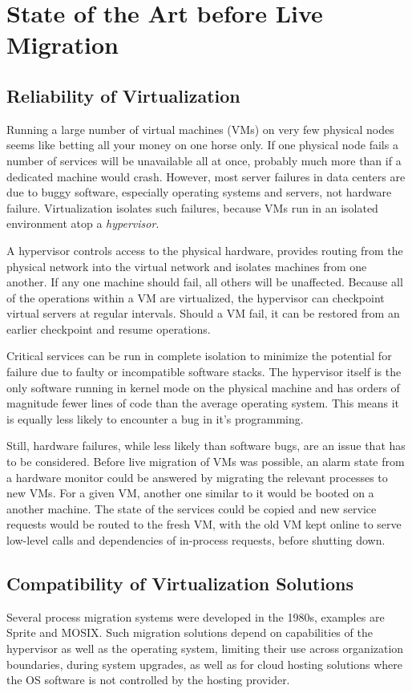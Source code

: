 \documentclass{scrartcl}
\begin{document}
\section{State of the Art before Live Migration}
\subsection{Reliability of Virtualization}
\label{sec:sota}

Running a large number of virtual machines (VMs) on very few physical
nodes seems like betting all your money on one horse only. If one
physical node fails a number of services will be unavailable all at
once, probably much more than if a dedicated machine would
crash. However, most server failures in data centers are due to buggy
software, especially operating systems and servers, not hardware
failure. Virtualization isolates such failures, because VMs run in an
isolated environment atop a \emph{hypervisor}.

A hypervisor controls access to the physical hardware, provides
routing from the physical network into the virtual network and
isolates machines from one another. If any one machine should fail,
all others will be unaffected. Because all of the operations within a
VM are virtualized, the hypervisor can checkpoint virtual servers at
regular intervals. Should a VM fail, it can be restored from an
earlier checkpoint and resume operations.

Critical services can be run in complete isolation to minimize the
potential for failure due to faulty or incompatible software
stacks. The hypervisor itself is the only software running in kernel
mode on the physical machine and has orders of magnitude fewer lines
of code than the average operating system. This means it is equally
less likely to encounter a bug in it's programming.

Still, hardware failures, while less likely than software bugs, are an
issue that has to be considered. Before live migration of VMs was
possible, an alarm state from a hardware monitor could be answered by
migrating the relevant processes to new VMs\cite{hansen2004self}. For
a given VM, another one similar to it would be booted on a another
machine. The state of the services could be copied and new service
requests would be routed to the fresh VM, with the old VM kept online
to serve low-level calls and dependencies of in-process requests,
before shutting down\cite{clark2005live}.

\subsection{Compatibility of Virtualization Solutions}
Several process migration systems were developed in the 1980s,
examples are Sprite and MOSIX\cite{hansen2004self}. Such migration
solutions depend on capabilities of the hypervisor as well as the
operating system, limiting their use across organization boundaries,
during system upgrades, as well as for cloud hosting solutions where
the OS software is not controlled by the hosting provider.
\end{document}
